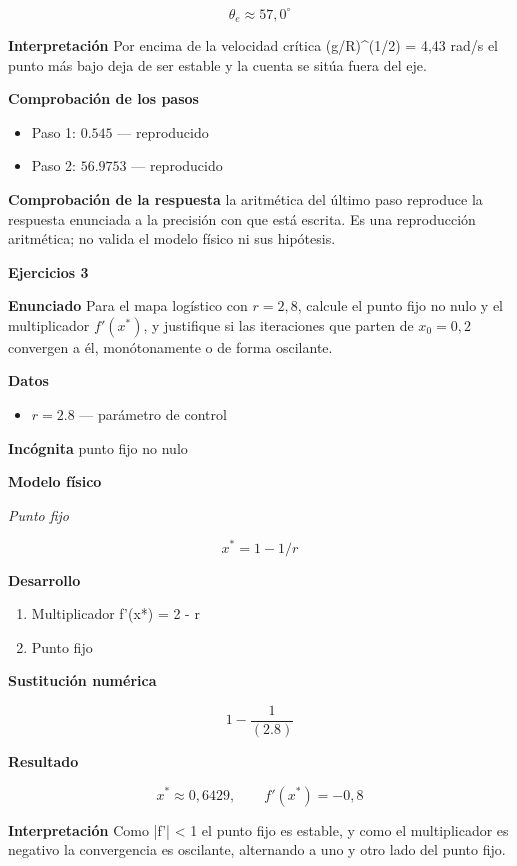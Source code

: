 \documentclass[10pt,openany]{book}
\begin{document}
\[
\theta_e \approx 57{,}0^{\circ}
\]

\noindent\textbf{Interpretación}
Por encima de la velocidad crítica (g/R)\textasciicircum{}(1/2) = 4,43 rad/s el punto más bajo deja de ser estable y la cuenta se sitúa fuera del eje.

\noindent\textbf{Comprobación de los pasos}
\begin{itemize}
\item Paso 1: $0.545$ — reproducido
\item Paso 2: $56.9753$ — reproducido
\end{itemize}

\noindent\textbf{Comprobación de la respuesta} la aritmética del último paso reproduce la respuesta enunciada a la precisión con que está escrita. Es una reproducción aritmética; no valida el modelo físico ni sus hipótesis.

\noindent\textbf{Ejercicios 3}

\noindent\textbf{Enunciado}
Para el mapa logístico con \(r = 2{,}8\), calcule el punto fijo no nulo y el multiplicador \(f'(x^{*})\), y justifique si las iteraciones que parten de \(x_0 = 0{,}2\) convergen a él, monótonamente o de forma oscilante.

\noindent\textbf{Datos}
\begin{itemize}
\item $r = 2.8$ — parámetro de control
\end{itemize}

\noindent\textbf{Incógnita}
punto fijo no nulo

\noindent\textbf{Modelo físico}

\noindent\textit{Punto fijo}

\[
x^{*} = 1 - 1/r
\]

\noindent\textbf{Desarrollo}
\begin{enumerate}
\item
Multiplicador f'(x*) = 2 - r
\item
Punto fijo
\end{enumerate}

\noindent\textbf{Sustitución numérica}

\[
1 - \frac{1}{\left(2.8\right)}
\]

\noindent\textbf{Resultado}

\[
x^{*} \approx 0{,}6429,\qquad f'(x^{*}) = -0{,}8
\]

\noindent\textbf{Interpretación}
Como |f'| < 1 el punto fijo es estable, y como el multiplicador es negativo la convergencia es oscilante, alternando a uno y otro lado del punto fijo.
\end{document}
